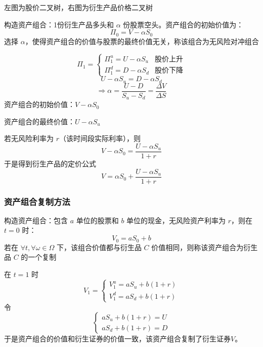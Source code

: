 \vspace{1em}

左图为股价二叉树，右图为衍生产品价格二叉树

\begin{definition}[无风险对冲组合]
构造资产组合：1份衍生产品多头和 $\alpha$ 份股票空头。资产组合的初始价值为：
\[
\Pi_0=V-\alpha S_0
\]
选择 $\alpha$，使得资产组合的价值与股票的最终价值无关，称该组合为无风险对冲组合
\end{definition}

\[
\Pi_1=\begin{cases}
    \Pi_1^u=U-\alpha S_u & \text{股价上升}\\
    \Pi_1^d=D-\alpha S_d & \text{股价下降}
\end{cases}
\]
\[
U-\alpha S_u=D-\alpha S_d
\]
\[
\Rightarrow \alpha=\frac{U-D}{S_u-S_d}=\frac{\Delta V}{\Delta S}
\]
资产组合的初始价值：$V-\alpha S_0$

资产组合的最终价值：$U-\alpha S_u$

若无风险利率为 $r$（该时间段实际利率），则
\[
    V-\alpha S_0=\frac{U-\alpha S_u}{1+r}
\]
于是得到衍生产品的定价公式
\[
    V=\alpha S_0+\frac{U-\alpha S_u}{1+r}
\]

\subsubsection{资产组合复制方法}

\begin{definition}[复制]
构造资产组合：包含 $a$ 单位的股票和 $b$ 单位的现金，无风险资产利率为 $r$，则在 $t=0$ 时：
\[
V_0=aS_0+b
\]
若在 $\forall t,\forall \omega\in \Omega$ 下，该组合价值都与衍生品 $C$ 价值相同，则称该资产组合为衍生品 $C$ 的一个复制
\end{definition}

在 $t=1$ 时
\[
V_1=\begin{cases}
    V_1^u=aS_u+b(1+r)\\
    V_1^d=aS_d+b(1+r)
\end{cases}
\]
令
\[
\begin{cases}
    aS_u+b(1+r)=U\\
    aS_d+b(1+r)=D
\end{cases}
\]
于是资产组合的价值和衍生证券的价值一致，该资产组合复制了衍生证券$V$。

